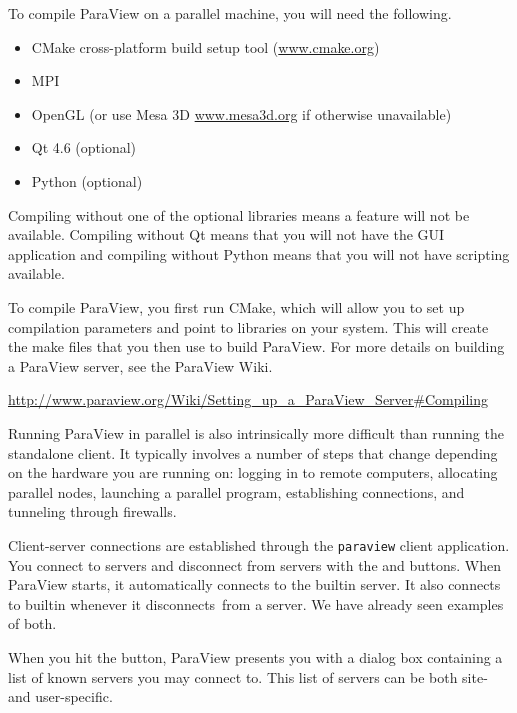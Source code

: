 To compile ParaView on a parallel machine, you will need the following.

\begin{itemize}
\item CMake cross-platform build setup tool
  (\href{http://www.cmake.org}{www.cmake.org})
\item MPI
\item OpenGL (or use Mesa 3D \href{http://www.mesa3d.org}{www.mesa3d.org}
  if otherwise unavailable)
\item Qt 4.6 (optional)
\item Python (optional)
\end{itemize}

Compiling without one of the optional libraries means a feature will not be
available.  Compiling without Qt means that you will not have the GUI
application and compiling without Python means that you will not have
scripting available.

To compile ParaView, you first run CMake, which will allow you to set up
compilation parameters and point to libraries on your system.  This will
create the make files that you then use to build ParaView.  For more
details on building a ParaView server, see the ParaView Wiki.

{
  \footnotesize
  \href{http://www.paraview.org/Wiki/Setting_up_a_ParaView_Server#Compiling}{http://www.paraview.org/Wiki/Setting\_up\_a\_ParaView\_Server\#Compiling}
}

Running ParaView in parallel is also intrinsically more difficult than
running the standalone client.  It typically involves a number of steps
that change depending on the hardware you are running on: logging in to
remote computers, allocating parallel nodes, launching a parallel program,
establishing connections, and tunneling through firewalls.

Client-server connections are established through the \texttt{paraview}
client application.  You connect to servers and disconnect from servers
with the \connect and \disconnect buttons.  When ParaView starts, it
automatically connects to the builtin server.  It also connects to
builtin whenever it disconnects~\disconnect from a server.  We have already
seen examples of both.

When you hit the \connect button, ParaView presents you with a dialog box
containing a list of known servers you may connect to.  This list of
servers can be both site- and user-specific.

